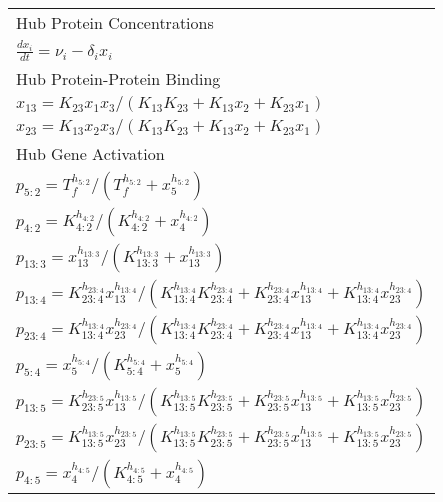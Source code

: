 \begin{table*}[!htbp]
\centering
\begin{tabular}{@{}l}
\toprule
Hub Protein Concentrations\\
${\displaystyle\frac{d{}x_i}{d{}t}=\nu_i - \delta_{i}  x_i}$\\
\midrule
Hub Protein-Protein Binding  \\
$x_{13} ={K_{23}  x_1  x_3}/{\left(K_{13} K_{23} + K_{13} x_2 + K_{23}  x_1\right)}$\\
$x_{23}={K_{13}  x_2  x_3}/{\left(K_{13} K_{23} + K_{13} x_2 + K_{23}  x_1\right)}$\\
\midrule
Hub Gene Activation  \\
$p_{5:2} = T_f^{h_{5:2}}/\left(T_f^{h_{5:2}}+x_5^{h_{5:2}}\right)$\\
$p_{4:2} = {K_{4:2}^{h_{4:2}}}/{\left(K_{4:2}^{h_{4:2}} + x_4^{h_{4:2}}\right)}$ \\ 
$p_{13:3} = {x_{13}^{h_{13:3}}}/{\left(K_{13:3}^{h_{13:3}}+x_{13}^{h_{13:3}}\right)}$\\
$p_{13:4} = {K_{23:4}^{h_{23:4}} x_{13}^{h_{13:4}}}/{\left(K_{13:4}^{h_{13:4}} K_{23:4}^{h_{23:4}}+ K_{23:4}^{h_{23:4}} x_{13}^{h_{13:4}} + K_{13:4}^{h_{13:4}} x_{23}^{h_{23:4}}\right)}$\\
$p_{23:4} = {K_{13:4}^{h_{13:4}} x_{23}^{h_{23:4}}}/{\left(K_{13:4}^{h_{13:4}} K_{23:4}^{h_{23:4}}+ K_{23:4}^{h_{23:4}} x_{13}^{h_{13:4}} + K_{13:4}^{h_{13:4}} x_{23}^{h_{23:4}}\right)}$\\
$p_{5:4} = {x_{5}^{h_{5:4}}}/{\left(K_{5:4}^{h_{5:4}}+x_{5}^{h_{5:4}}\right)}$\\
$p_{13:5} = {K_{23:5}^{h_{23:5}} x_{13}^{h_{13:5}}}/{\left(K_{13:5}^{h_{13:5}} K_{23:5}^{h_{23:5}}+ K_{23:5}^{h_{23:5}} x_{13}^{h_{13:5}} + K_{13:5}^{h_{13:5}} x_{23}^{h_{23:5}}\right)}$\\
$p_{23:5} = {K_{13:5}^{h_{13:5}} x_{23}^{h_{23:5}}}/{\left(K_{13:5}^{h_{13:5}} K_{23:5}^{h_{23:5}}+ K_{23:5}^{h_{23:5}} x_{13}^{h_{13:5}} + K_{13:5}^{h_{13:5}} x_{23}^{h_{23:5}}\right)}$\\ 
$p_{4:5} = {x_{4}^{h_{4:5}}}/{\left(K_{4:5}^{h_{4:5}}+x_{4}^{h_{4:5}}\right)}$\\
\midrule

\end{tabular}
\end{table*}
